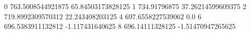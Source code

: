 0 763.5008544921875 65.84503173828125
1 734.91796875 37.26214599609375
2 719.8992309570312 22.243408203125
4 697.6558227539062 0.0
6 696.5383911132812 -1.117431640625
8 696.14111328125 -1.51470947265625
